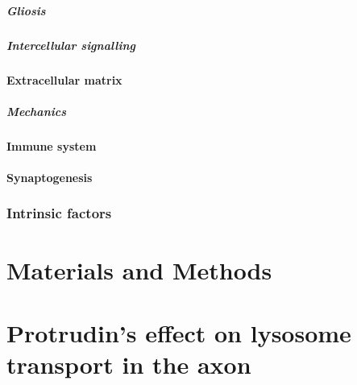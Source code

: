 \documentclass[
]{book}
\begin{document}
\hypertarget{gliosis}{%
\paragraph{Gliosis}\label{gliosis}}

\hypertarget{intercellular-signalling}{%
\paragraph{Intercellular signalling}\label{intercellular-signalling}}

\hypertarget{extracellular-matrix}{%
\subsubsection{Extracellular matrix}\label{extracellular-matrix}}

\hypertarget{mechanics}{%
\paragraph{Mechanics}\label{mechanics}}

\hypertarget{immune-system}{%
\subsubsection{Immune system}\label{immune-system}}

\hypertarget{synaptogenesis}{%
\subsubsection{Synaptogenesis}\label{synaptogenesis}}

\hypertarget{intrinsic-factors}{%
\subsection{Intrinsic factors}\label{intrinsic-factors}}

\hypertarget{METHODS}{%
\chapter*{Materials and Methods}\label{METHODS}}


\hypertarget{protrudins-effect-on-lysosome-transport-in-the-axon}{%
\chapter{Protrudin's effect on lysosome transport in the axon}\label{protrudins-effect-on-lysosome-transport-in-the-axon}}
\end{document}
